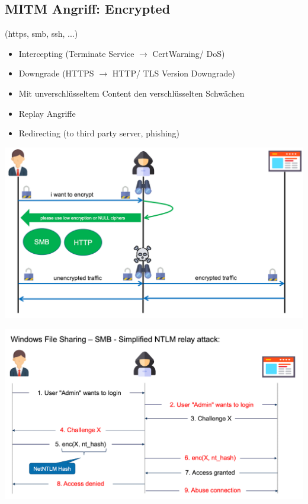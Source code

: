 \subsection{MITM Angriff: Encrypted}
(https, smb, ssh, ...)
\begin{itemize}
    \item Intercepting (Terminate Service $\rightarrow$ CertWarning/ DoS)
    \item Downgrade (HTTPS $\rightarrow$ HTTP/ TLS Version Downgrade)
    \item Mit unverschlüsseltem Content den verschlüsselten Schwächen
    \item Replay Angriffe
    \item Redirecting (to third party server, phishing)
\end{itemize}
\begin{center}
    \vspace{-8pt}
    \includegraphics[width=.8\linewidth]{./img/09-mitm/mitm_enctypt_2}
    \vspace{-8pt}
\end{center}
\begin{center}
    \vspace{-8pt}
    \includegraphics[width=.8\linewidth]{./img/09-mitm/mitm_enctypt_3}
    \vspace{-8pt}
\end{center}

